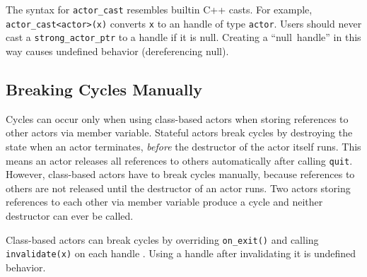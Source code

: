 The syntax for \lstinline^actor_cast^ resembles builtin C++ casts. For example, \lstinline^actor_cast<actor>(x)^ converts \lstinline^x^ to an handle of type \lstinline^actor^. Users should never cast a \lstinline^strong_actor_ptr^ to a handle if it is null. Creating a ``null~handle'' in this way causes undefined behavior (dereferencing null).

\subsection{Breaking Cycles Manually}
\label{breaking-cycles}

Cycles can occur only when using class-based actors when storing references to other actors via member variable. Stateful actors  break cycles by destroying the state when an actor terminates, \emph{before} the destructor of the actor itself runs. This means an actor releases all references to others automatically after calling \lstinline^quit^. However, class-based actors have to break cycles manually, because references to others are not released until the destructor of an actor runs. Two actors storing references to each other via member variable produce a cycle and neither destructor can ever be called.

Class-based actors can break cycles by overriding \lstinline^on_exit()^ and calling \lstinline^invalidate(x)^ on each handle . Using a handle after invalidating it is undefined behavior.



